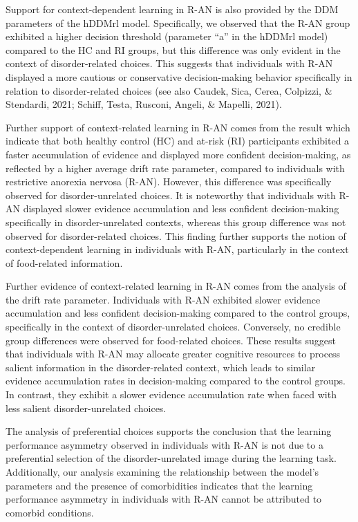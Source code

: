 \documentclass[
  man,floatsintext]{apa6}
\begin{document}
Support for context-dependent learning in R-AN is also provided by the DDM parameters of the hDDMrl model. Specifically, we observed that the R-AN group exhibited a higher decision threshold (parameter ``a'' in the hDDMrl model) compared to the HC and RI groups, but this difference was only evident in the context of disorder-related choices. This suggests that individuals with R-AN displayed a more cautious or conservative decision-making behavior specifically in relation to disorder-related choices (see also Caudek, Sica, Cerea, Colpizzi, \& Stendardi, 2021; Schiff, Testa, Rusconi, Angeli, \& Mapelli, 2021).

Further support of context-related learning in R-AN comes from the result which indicate that both healthy control (HC) and at-risk (RI) participants exhibited a faster accumulation of evidence and displayed more confident decision-making, as reflected by a higher average drift rate parameter, compared to individuals with restrictive anorexia nervosa (R-AN). However, this difference was specifically observed for disorder-unrelated choices. It is noteworthy that individuals with R-AN displayed slower evidence accumulation and less confident decision-making specifically in disorder-unrelated contexts, whereas this group difference was not observed for disorder-related choices. This finding further supports the notion of context-dependent learning in individuals with R-AN, particularly in the context of food-related information.

Further evidence of context-related learning in R-AN comes from the analysis of the drift rate parameter. Individuals with R-AN exhibited slower evidence accumulation and less confident decision-making compared to the control groups, specifically in the context of disorder-unrelated choices. Conversely, no credible group differences were observed for food-related choices. These results suggest that individuals with R-AN may allocate greater cognitive resources to process salient information in the disorder-related context, which leads to similar evidence accumulation rates in decision-making compared to the control groups. In contrast, they exhibit a slower evidence accumulation rate when faced with less salient disorder-unrelated choices.

The analysis of preferential choices supports the conclusion that the learning performance asymmetry observed in individuals with R-AN is not due to a preferential selection of the disorder-unrelated image during the learning task. Additionally, our analysis examining the relationship between the model's parameters and the presence of comorbidities indicates that the learning performance asymmetry in individuals with R-AN cannot be attributed to comorbid conditions.
\end{document}

